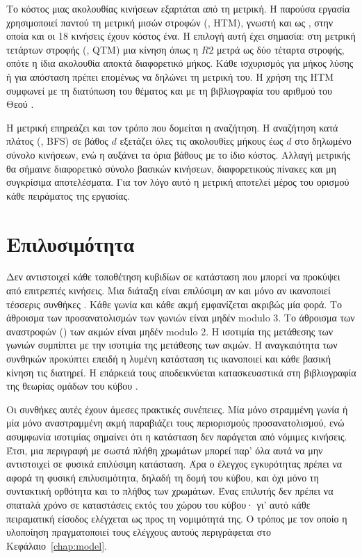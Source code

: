 Το κόστος μιας ακολουθίας κινήσεων εξαρτάται από τη μετρική. Η παρούσα εργασία χρησιμοποιεί παντού τη μετρική μισών στροφών (, HTM), γνωστή και ως , στην οποία και οι 18 κινήσεις έχουν κόστος ένα. Η επιλογή αυτή έχει σημασία: στη μετρική τετάρτων στροφής (, QTM) μια κίνηση όπως η \(R2\) μετρά ως δύο τέταρτα στροφής, οπότε η ίδια ακολουθία αποκτά διαφορετικό μήκος. Κάθε ισχυρισμός για μήκος λύσης ή για απόσταση πρέπει επομένως να δηλώνει τη μετρική του. Η χρήση της HTM συμφωνεί με τη διατύπωση του θέματος και με τη βιβλιογραφία του αριθμού του Θεού \cite{rokicki2010godsnumber,rokicki2013diameter}.

Η μετρική επηρεάζει και τον τρόπο που δομείται η αναζήτηση. Η αναζήτηση κατά πλάτος (, BFS) σε βάθος \(d\) εξετάζει όλες τις ακολουθίες μήκους έως \(d\) στο δηλωμένο σύνολο κινήσεων, ενώ η  αυξάνει τα όρια βάθους με το ίδιο κόστος. Αλλαγή μετρικής θα σήμαινε διαφορετικό σύνολο βασικών κινήσεων, διαφορετικούς πίνακες και μη συγκρίσιμα αποτελέσματα. Για τον λόγο αυτό η μετρική αποτελεί μέρος του ορισμού κάθε πειράματος της εργασίας.

\section{Επιλυσιμότητα}
\label{sec:background-solvability}

Δεν αντιστοιχεί κάθε τοποθέτηση κυβιδίων σε κατάσταση που μπορεί να προκύψει από επιτρεπτές κινήσεις. Μια διάταξη είναι επιλύσιμη αν και μόνο αν ικανοποιεί τέσσερις συνθήκες \cite{joyner2008adventures}. Κάθε γωνία και κάθε ακμή εμφανίζεται ακριβώς μία φορά. Το άθροισμα των προσανατολισμών των γωνιών είναι μηδέν modulo 3. Το άθροισμα των αναστροφών () των ακμών είναι μηδέν modulo 2. Η ισοτιμία της μετάθεσης των γωνιών συμπίπτει με την ισοτιμία της μετάθεσης των ακμών. Η αναγκαιότητα των συνθηκών προκύπτει επειδή η λυμένη κατάσταση τις ικανοποιεί και κάθε βασική κίνηση τις διατηρεί. Η επάρκειά τους αποδεικνύεται κατασκευαστικά στη βιβλιογραφία της θεωρίας ομάδων του κύβου \cite{joyner2008adventures}.

Οι συνθήκες αυτές έχουν άμεσες πρακτικές συνέπειες. Μία μόνο στραμμένη γωνία ή μία μόνο αναστραμμένη ακμή παραβιάζει τους περιορισμούς προσανατολισμού, ενώ ασυμφωνία ισοτιμίας σημαίνει ότι η κατάσταση δεν παράγεται από νόμιμες κινήσεις. Έτσι, μια περιγραφή με σωστά πλήθη χρωμάτων μπορεί παρ' όλα αυτά να μην αντιστοιχεί σε φυσικά επιλύσιμη κατάσταση. Άρα ο έλεγχος εγκυρότητας πρέπει να αφορά τη φυσική επιλυσιμότητα, δηλαδή τη δομή του κύβου, και όχι μόνο τη συντακτική ορθότητα και το πλήθος των χρωμάτων. Ένας επιλυτής δεν πρέπει να σπαταλά χρόνο σε καταστάσεις εκτός του χώρου του κύβου· γι' αυτό κάθε πειραματική είσοδος ελέγχεται ως προς τη νομιμότητά της. Ο τρόπος με τον οποίο η υλοποίηση πραγματοποιεί τους ελέγχους αυτούς περιγράφεται στο Κεφάλαιο~\ref{chap:model}.

